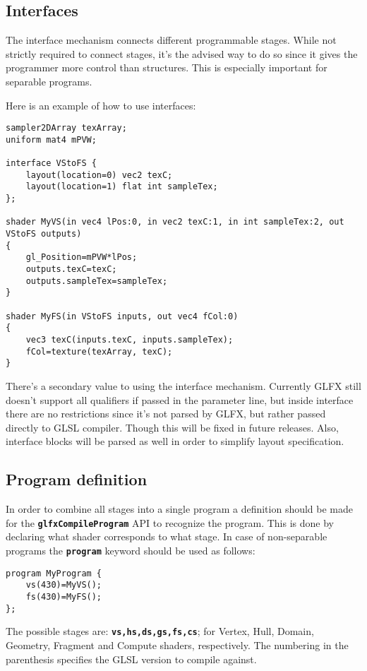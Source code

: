 \documentclass[11pt,a4paper,final,titlepage]{article}
\begin{document}
\subsection{Interfaces}
The interface mechanism connects different programmable stages. While not
strictly required to connect stages, it's the advised way to do so since
it gives the programmer more control than structures. This is especially important for separable
programs.

Here is an example of how to use interfaces:
\begin{lstlisting}
sampler2DArray texArray;
uniform mat4 mPVW;

interface VStoFS {
	layout(location=0) vec2 texC;
	layout(location=1) flat int sampleTex;
};

shader MyVS(in vec4 lPos:0, in vec2 texC:1, in int sampleTex:2, out VStoFS outputs)
{
	gl_Position=mPVW*lPos;
	outputs.texC=texC;
	outputs.sampleTex=sampleTex;
}

shader MyFS(in VStoFS inputs, out vec4 fCol:0)
{
	vec3 texC(inputs.texC, inputs.sampleTex);
	fCol=texture(texArray, texC);
}
\end{lstlisting}

There's a secondary value to using the interface mechanism. Currently GLFX still doesn't
support all qualifiers if passed in the parameter line, but inside interface there are no restrictions
since it's not parsed by GLFX, but rather passed directly to GLSL compiler. Though this
will be fixed in future releases. Also, interface blocks will be parsed as well in order to
simplify layout specification.

\subsection{Program definition}\label{sec:programs_def}
In order to combine all stages into a single program a definition should be made for the
\texttt{\textbf{glfx\-Compile\-Program}} API to recognize the program. This is done by declaring
what shader corresponds to what stage. In case of non-separable programs
the \texttt{\textbf{program}} keyword should be used as follows:

\begin{lstlisting}
program MyProgram {
	vs(430)=MyVS();
	fs(430)=MyFS();
};
\end{lstlisting}

The possible stages are: \texttt{\textbf{vs,hs,ds,gs,fs,cs}}; for Vertex, Hull, Domain, Geometry, Fragment
and Compute shaders, respectively. The numbering in the parenthesis specifies the GLSL
version to compile against.
\end{document}
